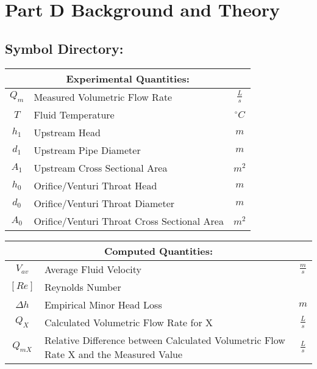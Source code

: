 \documentclass[12pt]{article}
\begin{document}
	\section{Part D Background and Theory}
	\hfill\break\break
	\subsection{Symbol Directory:}
	{
	\centering
	\begin{tabular}{|c|l|c|}
		\hline
		\multicolumn{3}{|c|}{\textbf{Experimental Quantities:}} \\
		\hline
		\hline
		$Q_m$ & Measured Volumetric Flow Rate & $\frac{L}{s}$\\
		$T$ & Fluid Temperature & $^{\circ}C$ \\
		$h_1$ & Upstream Head & $m$ \\
		$d_1$ & Upstream Pipe Diameter & $m$ \\
		$A_1$ & Upstream Cross Sectional Area & $m^2$ \\
		$h_0$ & Orifice/Venturi Throat Head & $m$ \\
		$d_0$ & Orifice/Venturi Throat Diameter & $m$ \\
		$A_0$ & Orifice/Venturi Throat Cross Sectional Area & $m^2$ \\
		\hline
	\end{tabular}
	}
	\hfill\break\break\break
	{
	\centering
	\begin{tabular}{|c|l|c|}
		\hline
		\multicolumn{3}{|c|}{\textbf{Computed Quantities:}} \\
		\hline
		\hline
		$V_{av}$ & Average Fluid Velocity & $\frac{m}{s}$\\
		$[Re]$ & Reynolds Number & ${}$ \\
		$\Delta h$ & Empirical Minor Head Loss & $m$\\
		$Q_X$ & Calculated Volumetric Flow Rate for X & $\frac{L}{s}$\\
		$Q_{mX}$ & Relative Difference between Calculated Volumetric Flow Rate X and the Measured Value & $\frac{L}{s}$\\
		\hline
	\end{tabular}
	}
\end{document}
